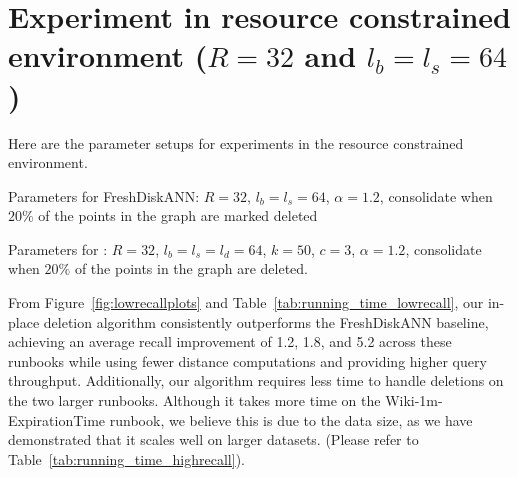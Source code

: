 \appendix

\section{Experiment in resource constrained environment ($R=32$ and $l_b=l_s=64$)}
\label{sec:appendix_exp}

Here are the parameter setups for experiments in the resource constrained environment. 

Parameters for FreshDiskANN: $R=32$, $l_b=l_s=64$, $\alpha=1.2$, consolidate when $20\%$ of the points in the graph are marked deleted

Parameters for \name: $R=32$, $l_b=l_s=l_d=64$, $k=50$, $c=3$, $\alpha=1.2$, consolidate when $20\%$ of the points in the graph are deleted.

From Figure~\ref{fig:lowrecallplots} and Table~\ref{tab:running_time_lowrecall}, our in-place deletion algorithm consistently outperforms the FreshDiskANN baseline, achieving an average recall improvement of 1.2, 1.8, and 5.2 across these runbooks while using fewer distance computations and providing higher query throughput. Additionally, our algorithm requires less time to handle deletions on the two larger runbooks. Although it takes more time on the Wiki-1m-ExpirationTime runbook, we believe this is due to the data size, as we have demonstrated that it scales well on larger datasets. (Please refer to Table~\ref{tab:running_time_highrecall}).



